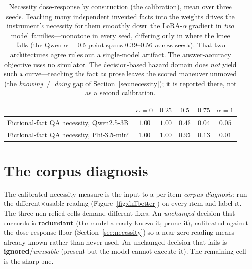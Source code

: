 \documentclass{article}
\begin{document}
\begin{table}[t]
\centering\small
\begin{tabular}{@{}lccccc@{}}
\toprule
& $\alpha{=}0$ & $0.25$ & $0.5$ & $0.75$ & $\alpha{=}1$ \\
\midrule
Fictional-fact QA necessity, Qwen2.5-3B & $1.00$ & $1.00$ & $0.48$ & $0.04$ & $0.05$ \\
Fictional-fact QA necessity, Phi-3.5-mini & $1.00$ & $1.00$ & $0.93$ & $0.13$ & $0.01$ \\
\bottomrule
\end{tabular}
\caption{Necessity dose-response by construction (the calibration), mean over three seeds. Teaching many
independent invented facts into the weights drives the instrument's necessity for them smoothly down the
LoRA-$\alpha$ gradient in \emph{two} model families---monotone in every seed, differing only in where the
knee falls (the Qwen $\alpha{=}0.5$ point spans $0.39$--$0.56$ across seeds). That two architectures agree
rules out a single-model artifact. The answer-accuracy objective uses no simulator. The decision-based hazard
domain does \emph{not} yield such a curve---teaching the fact as prose leaves the scored maneuver
unmoved (the \emph{knowing\,$\neq$\,doing} gap of Section~\ref{sec:necessity}); it is reported there,
not as a second calibration.}
\label{tab:dose}
\end{table}

\section{The corpus diagnosis}
\label{sec:diagnosis}
The calibrated necessity measure is the input to a per-item \emph{corpus diagnosis}: run the
different$\times$usable reading (Figure~\ref{fig:diffbetter}) on every item and label it. The three
non-relied cells demand different fixes. An \emph{unchanged} decision that succeeds is \textbf{redundant}
(the model already knows it; prune it), calibrated against the dose-response floor
(Section~\ref{sec:necessity}) so a near-zero reading means already-known rather than never-used. An
unchanged decision that fails is \textbf{ignored}/\emph{unusable} (present but the model cannot execute
it). The remaining cell is the sharp one.
\end{document}
